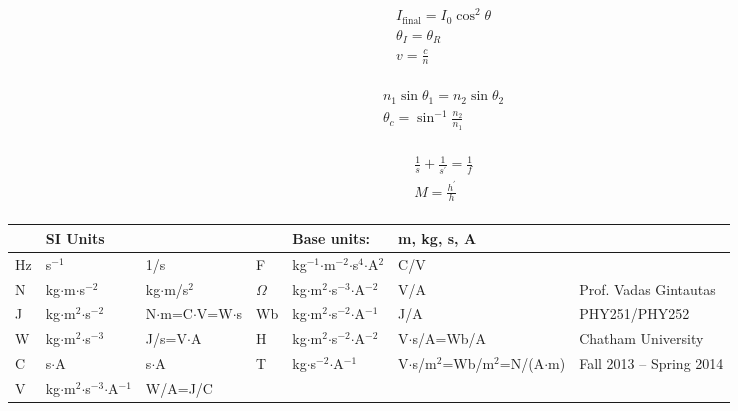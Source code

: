 \documentclass[9pt,letterpaper]{article}
\begin{document}
\vspace{-0.4in}
\begin{minipage}[t]{0.33\linewidth}
\begin{align*}
    &I_{\text{final}}=I_{0}\cos^{2}{\theta}\\
    &\theta_{I} = \theta_{R}\\
    &v=\frac{c}{n}\\
\end{align*}
\end{minipage}
\begin{minipage}[t]{0.3\linewidth}
\begin{align*}
    &n_{1}\sin{\theta_{1}} = n_{2}\sin{\theta_{2}}\\
    &\theta_{c} = \sin^{-1}{\frac{n_{2}}{n_{1}}}\\
\end{align*}
\end{minipage}
\begin{minipage}[t]{0.33\linewidth}
\begin{align*}
    &\frac{1}{s} + \frac{1}{s^{\prime}} = \frac{1}{f}\\
    &M=\frac{h^{\prime}}{h}\\
\end{align*}
\end{minipage}
\vspace{-0.4in}




         \vspace{0.3in}

\begin{minipage}[t]{\linewidth}
    \begin{tabular}{|l l l|l l l|l|}
        \hline
        &{\bf SI Units}& & &Base units: &m, kg, s, A &\\
        \hline
        Hz &s$^{-1}$&1/s&F &kg$^{-1}$$\cdot$m$^{-2}$$\cdot$s$^{4}$$\cdot$A$^{2}$&C/V& \\
        N &kg$\cdot$m$\cdot$s$^{-2}$&kg$\cdot$m/s$^{2}$& $\Omega$&kg$\cdot$m$^{2}$$\cdot$s$^{-3}$$\cdot$A$^{-2}$&V/A&Prof. Vadas Gintautas\\
        J &kg$\cdot$m$^{2}$$\cdot$s$^{-2}$&N$\cdot$m=C$\cdot$V=W$\cdot$s& Wb &kg$\cdot$m$^{2}$$\cdot$s$^{-2}$$\cdot$A$^{-1}$&J/A &PHY251/PHY252\\
        W &kg$\cdot$m$^{2}$$\cdot$s$^{-3}$&J/s=V$\cdot$A& H &kg$\cdot$m$^{2}$$\cdot$s$^{-2}$$\cdot$A$^{-2}$&V$\cdot$s/A=Wb/A&Chatham University\\
        C &s$\cdot$A&s$\cdot$A& T &kg$\cdot$s$^{-2}$$\cdot$A$^{-1}$&V$\cdot$s/m$^{2}$=Wb/m$^{2}$=N/(A$\cdot$m)&Fall 2013 -- Spring 2014\\
        V &kg$\cdot$m$^{2}$$\cdot$s$^{-3}$$\cdot$A$^{-1}$ &W/A=J/C & & &&\\
        \hline
          \end{tabular}
\end{minipage}
\end{document}
